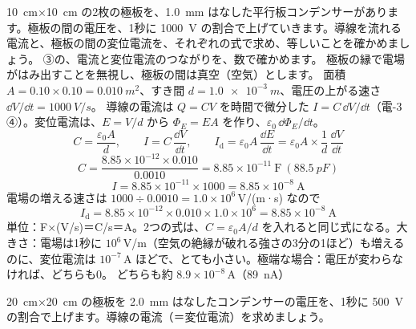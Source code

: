 \begin{phreidai}
\label{ph:電-14:ex2}\qty{10}{cm}×\qty{10}{cm} の2枚の極板を、\qty{1.0}{mm} はなした平行板コンデンサーがあります。極板の間の電圧を、1秒に \qty{1000}{V} の割合で上げていきます。導線を流れる電流と、極板の間の変位電流を、それぞれの式で求め、等しいことを確かめましょう。
\phbamen
③の、電流と変位電流のつながりを、数で確かめます。
\phmushi
極板の縁で電場がはみ出すことを無視し、極板の間は真空（空気）とします。
\phzu
面積 $A=0.10\times0.10=\qty{0.010}{m^2}$、すき間 $d=\qty{1.0e-3}{m}$、電圧の上がる速さ $\dd V/\dd t=\qty{1000}{V/s}$。
\phriyu
導線の電流は $Q=CV$ を時間で微分した $I=C\,\dd V/\dd t$（電-3 ④）。変位電流は、$E=V/d$ から $\Phi_E=EA$ を作り、$\varepsilon_0\,\dd\Phi_E/\dd t$。
\phtateru
\[ C=\frac{\varepsilon_0A}{d},\qquad I=C\,\frac{\dd V}{\dd t},\qquad I_{\mathrm d}=\varepsilon_0A\,\frac{\dd E}{\dd t}=\varepsilon_0A\times\frac{1}{d}\,\frac{\dd V}{\dd t} \]
\phtoku
\[ C=\frac{8.85\times10^{-12}\times0.010}{0.0010}=8.85\times10^{-11}\ \mathrm{F}\ (\qty{88.5}{pF}) \]
\[ I=8.85\times10^{-11}\times1000=8.85\times10^{-8}\ \mathrm{A} \]
電場の増える速さは $1000\div0.0010=1.0\times10^6$\,V/(m·s) なので
\[ I_{\mathrm d}=8.85\times10^{-12}\times0.010\times1.0\times10^6=8.85\times10^{-8}\ \mathrm{A} \]
\phtashikame
単位：F×(V/s)＝C/s＝A。2つの式は、$C=\varepsilon_0A/d$ を入れると同じ式になる。大きさ：電場は1秒に $10^6$\,V/m（空気の絶縁が破れる強さの3分の1ほど）も増えるのに、変位電流は $10^{-7}$\,A ほどで、とても小さい。極端な場合：電圧が変わらなければ、どちらも0。
\kotae どちらも約 $8.9\times10^{-8}$\,A（\qty{89}{nA}）
\end{phreidai}
\begin{jibun}
\qty{20}{cm}×\qty{20}{cm} の極板を \qty{2.0}{mm} はなしたコンデンサーの電圧を、1秒に \qty{500}{V} の割合で上げます。導線の電流（＝変位電流）を求めましょう。
\end{jibun}

